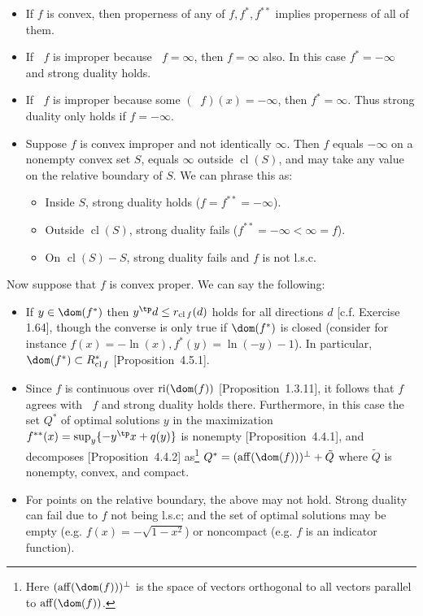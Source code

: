 \documentclass{article}
\DeclareMathOperator{\cl}{cl}
\DeclareMathOperator{\aff}{aff}
\DeclareMathOperator{\relint}{ri}
\DeclareMathOperator{\cvxcl}{\breve{cl}}
\begin{document}
\begin{itemize}
\item If $f$ is convex, then properness of any of $f, f^*, f^{**}$ implies properness of all of them.
\item If $\cvxcl f$ is improper because $\cvxcl f = \infty$, then $f = \infty$ also.  In this case $f^* = -\infty$ and strong duality holds.
\item If $\cvxcl f$ is improper because some $(\cvxcl f)(x) = -\infty$, then $f^* = \infty$.  Thus strong duality only holds if $f = -\infty$.
\item Suppose $f$ is convex improper and not identically $\infty$.  Then $f$ equals $-\infty$ on a nonempty convex set $S$, equals $\infty$ outside $\cl(S)$, and may take any value on the relative boundary of $S$.  We can phrase this as:
  \begin{itemize}
  \item Inside $S$, strong duality holds ($f = f^{**} = -\infty$).
  \item Outside $\cl(S)$, strong duality fails ($f^{**} = -\infty < \infty = f$).
  \item On $\cl(S) - S$, strong duality fails and $f$ is not l.s.c.
  \end{itemize}
\end{itemize}

Now suppose that $f$ is convex proper.  We can say the following:
\begin{itemize}
\item If $y \in \dom(f^*)$ then $y^\tp d \le r_{\cl f}(d)$ holds for all directions $d$
  [c.f. Exercise 1.64], though the converse is only true if $\dom(f^*)$ is closed (consider for instance $f(x) = -\ln(x), f^*(y) = \ln(-y) - 1$).
  In particular, $\dom(f^*) \subset R_{\cl f}^*$ [Proposition~4.5.1].
\item Since $f$ is continuous over $\relint(\dom(f))$ [Proposition~1.3.11], it follows that $f$ agrees with $\cvxcl f$ and strong duality holds there.
  Furthermore, in this case the set $Q^*$ of optimal solutions $y$ in the maximization $f^{**}(x) = \sup_y\{-y^\tp x + q(y)\}$ is nonempty [Proposition~4.4.1], and decomposes [Proposition~4.4.2] as\footnote{%
  Here $(\aff(\dom(f)))^\bot$ is the space of vectors orthogonal to all vectors parallel to $\aff(\dom(f))$.
  } $Q^* = (\aff(\dom(f)))^\bot + \tilde Q$ where $\tilde Q$ is nonempty, convex, and compact.
\item For points on the relative boundary, the above may not hold.  Strong duality can fail due to $f$ not being l.s.c; and the set of optimal solutions may be empty (e.g. $f(x) = -\sqrt{1 - x^2}$) or noncompact (e.g. $f$ is an indicator function).
\end{itemize}
\end{document}
